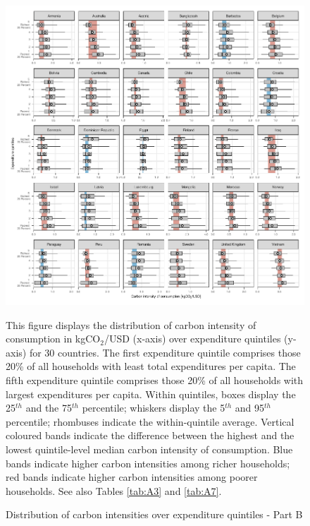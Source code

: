 \documentclass[12pt, a4paper]{article}
\newenvironment{subcaption}
{\strut
\vspace{-5pt}
\begin{minipage}[b]{0.9\textwidth}
  \hspace*{-\parindent}
  \footnotesize}
 {\end{minipage}}
\begin{document}
\clearpage

\begin{figure}[ht!]
  \centering
  \caption{Distribution of carbon intensities over expenditure quintiles - Part B} \label{fig:Quint_B}
  \includegraphics{1_Figures/Figures_Appendix/Figure_1_2017_Appendix_2}
  \begin{subcaption}
    This figure displays the distribution of carbon intensity of consumption in kgCO$_{2}$/USD (x-axis) over expenditure quintiles (y-axis) for 30 countries. The first expenditure quintile comprises those 20\% of all households with least total expenditures per capita. The fifth expenditure quintile comprises those 20\% of all households with largest expenditures per capita. Within quintiles, boxes display the 25$^{th}$ and the 75$^{th}$ percentile; whiskers display the 5$^{th}$ and 95$^{th}$ percentile; rhombuses indicate the within-quintile average. Vertical coloured bands indicate the difference between the highest and the lowest quintile-level median carbon intensity of consumption. Blue bands indicate higher carbon intensities among richer households; red bands indicate higher carbon intensities among poorer households. See also Tables \ref{tab:A3} and \ref{tab:A7}.
  \end{subcaption}

\end{figure}
\end{document}
